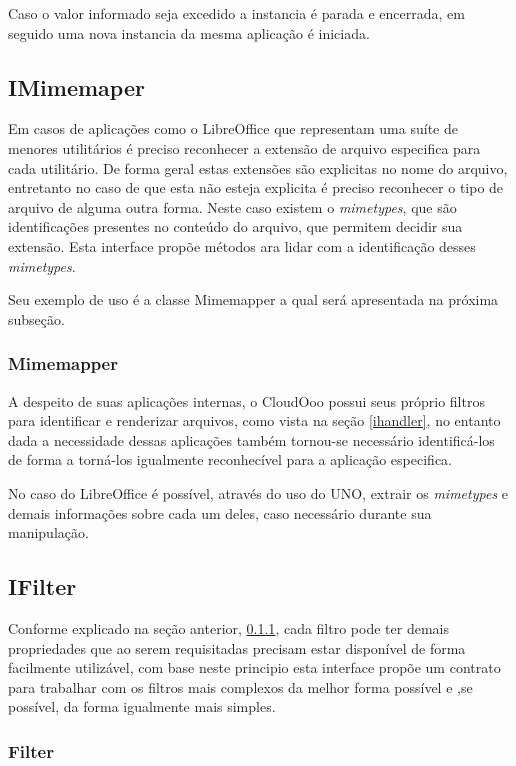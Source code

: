 Caso o valor informado seja excedido a instancia é parada e encerrada, em seguido uma nova instancia da mesma aplicação é iniciada.

\subsection{IMimemaper}

Em casos de aplicações como o LibreOffice que representam uma suíte de menores utilitários é preciso reconhecer a extensão de arquivo especifica para cada utilitário. De forma geral estas extensões são explicitas no nome do arquivo, entretanto no caso de que esta não esteja explicita é preciso reconhecer o tipo de arquivo de alguma outra forma. Neste caso existem o \textit{mimetypes}, que são identificações presentes no conteúdo do arquivo, que permitem decidir sua extensão. Esta interface propõe métodos ara lidar com a identificação desses \textit{mimetypes}.

Seu exemplo de uso é a classe Mimemapper a qual será apresentada na próxima subseção.

\subsubsection{Mimemapper}
\label{mimemapper}

A despeito de suas aplicações internas, o CloudOoo possui seus próprio filtros para identificar e renderizar arquivos, como vista na seção \ref{ihandler}, no entanto dada a necessidade dessas aplicações também tornou-se necessário identificá-los de forma a torná-los igualmente reconhecível para a aplicação especifica.

No caso do LibreOffice é possível, através do uso do UNO, extrair os \textit{mimetypes} e demais informações sobre cada um deles, caso necessário durante sua manipulação.

\subsection{IFilter}

Conforme explicado na seção anterior, \ref{mimemapper}, cada filtro pode ter demais propriedades que ao serem requisitadas precisam estar disponível de forma facilmente utilizável, com base neste principio esta interface propõe um contrato para trabalhar com os filtros mais complexos da melhor forma possível e ,se possível, da forma igualmente mais simples.

\subsubsection{Filter}

